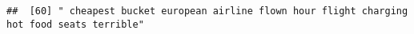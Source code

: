 \documentclass[
]{article}
\begin{document}
\begin{verbatim}
##  [60] " cheapest bucket european airline flown hour flight charging hot food seats terrible"                                                                                                                                                                                                                                                                                                                                                                                                                                                                                                                                                                                                                                                                                                                                                                                                                                                                                                                                                                                                                                                                                                                                                                                                                                                                                                                                                                                                                                                                                                                                                                                                                                                                                                          

\end{verbatim}
\end{document}
